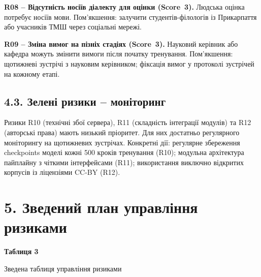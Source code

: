 \documentclass[14pt]{extarticle}
\begin{document}
\textbf{R08 -- Відсутність носіїв діалекту для оцінки (Score~3).}
Людська оцінка потребує носіїв мови. Пом'якшення: залучити студентів-філологів із Прикарпаття або учасників ТМШ через соціальні мережі.

\textbf{R09 -- Зміна вимог на пізніх стадіях (Score~3).}
Науковий керівник або кафедра можуть змінити вимоги після початку тренування. Пом'якшення: щотижневі зустрічі з науковим керівником; фіксація вимог у протоколі зустрічей на кожному етапі.

\subsection*{4.3. Зелені ризики -- моніторинг}

Ризики R10 (технічні збої сервера), R11 (складність інтеграції модулів) та R12 (авторські права) мають низький пріоритет. Для них достатньо регулярного моніторингу на щотижневих зустрічах. Конкретні дії: регулярне збереження checkpoints моделі кожні 500 кроків тренування (R10); модульна архітектура пайплайну з чіткими інтерфейсами (R11); використання виключно відкритих корпусів із ліцензіями CC-BY (R12).

\section*{5. Зведений план управління ризиками}

\noindent\textbf{Таблиця 3}

\noindent Зведена таблиця управління ризиками
\end{document}
